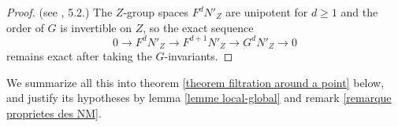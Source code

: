 \documentclass{article}
\theoremstyle{definition}
\newtheorem{defi}[thm]{Definition}
\theoremstyle{remark}
\newtheorem{rem}{Remark}[thm]
\begin{document}
\begin{proof} (see \cite{TameRamification}, 5.2.)
The $Z$-group spaces $F^d N'_Z$ are unipotent for $d\geq 1$ and the order of $G$ is invertible on $Z$, so the exact sequence
\[
0\longrightarrow F^d N'_Z\longrightarrow F^{d+1} N'_Z\longrightarrow G^d N'_Z\longrightarrow 0
\]
remains exact after taking the $G$-invariants.
\end{proof}





We summarize all this into theorem \ref{theorem filtration around a point} below, and justify its hypotheses by lemma \ref{lemme local-global} and remark \ref{remarque proprietes des NM}.
\end{document}
